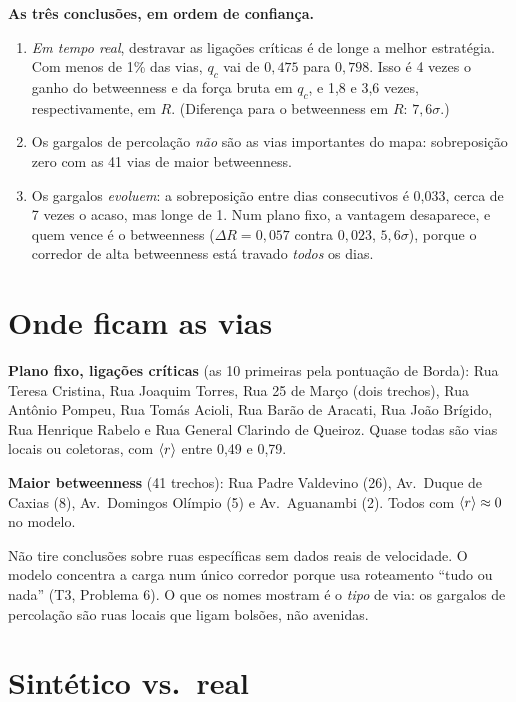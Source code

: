 \documentclass[11pt]{article}
\begin{document}
\begin{ideia}
\textbf{As três conclusões, em ordem de confiança.}
\begin{enumerate}
  \item \emph{Em tempo real}, destravar as ligações críticas é de longe a melhor estratégia. Com menos de 1\% das vias, $q_c$ vai de $0{,}475$ para $0{,}798$. Isso é 4 vezes o ganho do betweenness e da força bruta em $q_c$, e 1,8 e 3,6 vezes, respectivamente, em $R$. (Diferença para o betweenness em $R$: $7{,}6\sigma$.)
  \item Os gargalos de percolação \emph{não} são as vias importantes do mapa: sobreposição zero com as 41 vias de maior betweenness.
  \item Os gargalos \emph{evoluem}: a sobreposição entre dias consecutivos é 0,033, cerca de 7 vezes o acaso, mas longe de 1. Num plano fixo, a vantagem desaparece, e quem vence é o betweenness ($\Delta R = 0{,}057$ contra $0{,}023$, $5{,}6\sigma$), porque o corredor de alta betweenness está travado \emph{todos} os dias.
\end{enumerate}
\end{ideia}

\section{Onde ficam as vias}

\textbf{Plano fixo, ligações críticas} (as 10 primeiras pela pontuação de Borda): Rua Teresa Cristina, Rua Joaquim Torres, Rua 25 de Março (dois trechos), Rua Antônio Pompeu, Rua Tomás Acioli, Rua Barão de Aracati, Rua João Brígido, Rua Henrique Rabelo e Rua General Clarindo de Queiroz. Quase todas são vias locais ou coletoras, com $\left\langle r \right\rangle$ entre 0,49 e 0,79.

\textbf{Maior betweenness} (41 trechos): Rua Padre Valdevino (26), Av.\ Duque de Caxias (8), Av.\ Domingos Olímpio (5) e Av.\ Aguanambi (2). Todos com $\left\langle r \right\rangle\approx0$ no modelo.

\begin{obs}
Não tire conclusões sobre ruas específicas sem dados reais de velocidade. O modelo concentra a carga num único corredor porque usa roteamento ``tudo ou nada'' (T3, Problema 6). O que os nomes mostram é o \emph{tipo} de via: os gargalos de percolação são ruas locais que ligam bolsões, não avenidas.
\end{obs}

\section{Sintético vs.\ real}
\end{document}
